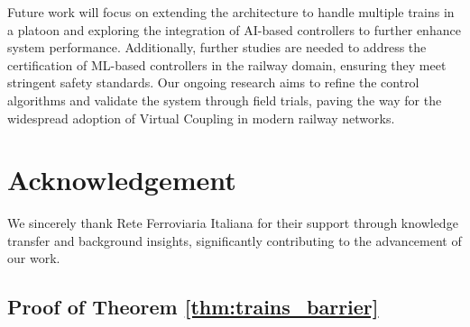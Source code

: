 \documentclass[letterpaper, 10 pt, conference]{ieeeconf}
\theoremstyle{definition}
\theoremstyle{nopoint}
\newcounter{Theorem}
\begin{document}
Future work will focus on extending the architecture to handle multiple trains in a platoon and exploring the integration of AI-based controllers to further enhance system performance. Additionally, further studies are needed to address the certification of ML-based controllers in the railway domain, ensuring they meet stringent safety standards. Our ongoing research aims to refine the control algorithms and validate the system through field trials, paving the way for the widespread adoption of Virtual Coupling in modern railway networks.


\section*{Acknowledgement}
We sincerely thank Rete Ferroviaria Italiana for their support through knowledge transfer and background insights, significantly contributing to the advancement of our work.

\appendix

\subsection{Proof of Theorem \ref{thm:trains_barrier}}
\label{appendix:proofTheorem}
\end{document}
